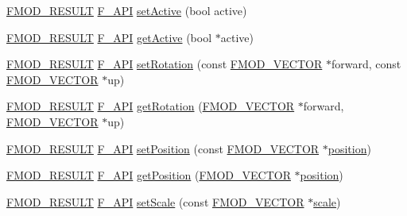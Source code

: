 \begin{DoxyCompactItemize}
\item 
\hyperlink{fmod_8h_ae6ddadf8cb315e93ae7e6456b19db276}{F\-M\-O\-D\-\_\-\-R\-E\-S\-U\-L\-T} \hyperlink{fmod_8h_ace803d13e798b0cdde4384f9f323b901}{F\-\_\-\-A\-P\-I} \hyperlink{class_f_m_o_d_1_1_geometry_aa12f6ef6232eead759d86d37b5bcd65f}{set\-Active} (bool active)
\item 
\hyperlink{fmod_8h_ae6ddadf8cb315e93ae7e6456b19db276}{F\-M\-O\-D\-\_\-\-R\-E\-S\-U\-L\-T} \hyperlink{fmod_8h_ace803d13e798b0cdde4384f9f323b901}{F\-\_\-\-A\-P\-I} \hyperlink{class_f_m_o_d_1_1_geometry_a421b1e652492dcf253b532c625730671}{get\-Active} (bool $\ast$active)
\item 
\hyperlink{fmod_8h_ae6ddadf8cb315e93ae7e6456b19db276}{F\-M\-O\-D\-\_\-\-R\-E\-S\-U\-L\-T} \hyperlink{fmod_8h_ace803d13e798b0cdde4384f9f323b901}{F\-\_\-\-A\-P\-I} \hyperlink{class_f_m_o_d_1_1_geometry_abe45900e1c2023f19b6d781a9c28b13a}{set\-Rotation} (const \hyperlink{struct_f_m_o_d___v_e_c_t_o_r}{F\-M\-O\-D\-\_\-\-V\-E\-C\-T\-O\-R} $\ast$forward, const \hyperlink{struct_f_m_o_d___v_e_c_t_o_r}{F\-M\-O\-D\-\_\-\-V\-E\-C\-T\-O\-R} $\ast$up)
\item 
\hyperlink{fmod_8h_ae6ddadf8cb315e93ae7e6456b19db276}{F\-M\-O\-D\-\_\-\-R\-E\-S\-U\-L\-T} \hyperlink{fmod_8h_ace803d13e798b0cdde4384f9f323b901}{F\-\_\-\-A\-P\-I} \hyperlink{class_f_m_o_d_1_1_geometry_ad813365cbc9b9ac89ad05de2853712bd}{get\-Rotation} (\hyperlink{struct_f_m_o_d___v_e_c_t_o_r}{F\-M\-O\-D\-\_\-\-V\-E\-C\-T\-O\-R} $\ast$forward, \hyperlink{struct_f_m_o_d___v_e_c_t_o_r}{F\-M\-O\-D\-\_\-\-V\-E\-C\-T\-O\-R} $\ast$up)
\item 
\hyperlink{fmod_8h_ae6ddadf8cb315e93ae7e6456b19db276}{F\-M\-O\-D\-\_\-\-R\-E\-S\-U\-L\-T} \hyperlink{fmod_8h_ace803d13e798b0cdde4384f9f323b901}{F\-\_\-\-A\-P\-I} \hyperlink{class_f_m_o_d_1_1_geometry_a36ca90c62cbc0c37938a51750ce865e7}{set\-Position} (const \hyperlink{struct_f_m_o_d___v_e_c_t_o_r}{F\-M\-O\-D\-\_\-\-V\-E\-C\-T\-O\-R} $\ast$\hyperlink{fmod__codec_8h_a7d71cf36b6a2fc185ecbc89f93fa58a3}{position})
\item 
\hyperlink{fmod_8h_ae6ddadf8cb315e93ae7e6456b19db276}{F\-M\-O\-D\-\_\-\-R\-E\-S\-U\-L\-T} \hyperlink{fmod_8h_ace803d13e798b0cdde4384f9f323b901}{F\-\_\-\-A\-P\-I} \hyperlink{class_f_m_o_d_1_1_geometry_a2d0e4a6525b54cd9a39c447995eba296}{get\-Position} (\hyperlink{struct_f_m_o_d___v_e_c_t_o_r}{F\-M\-O\-D\-\_\-\-V\-E\-C\-T\-O\-R} $\ast$\hyperlink{fmod__codec_8h_a7d71cf36b6a2fc185ecbc89f93fa58a3}{position})
\item 
\hyperlink{fmod_8h_ae6ddadf8cb315e93ae7e6456b19db276}{F\-M\-O\-D\-\_\-\-R\-E\-S\-U\-L\-T} \hyperlink{fmod_8h_ace803d13e798b0cdde4384f9f323b901}{F\-\_\-\-A\-P\-I} \hyperlink{class_f_m_o_d_1_1_geometry_a46104dceeff4a02e5aae989f86951b2f}{set\-Scale} (const \hyperlink{struct_f_m_o_d___v_e_c_t_o_r}{F\-M\-O\-D\-\_\-\-V\-E\-C\-T\-O\-R} $\ast$\hyperlink{glew_8h_a281421b881aa7a1266842b73a3bc7655}{scale})

\end{DoxyCompactItemize}
